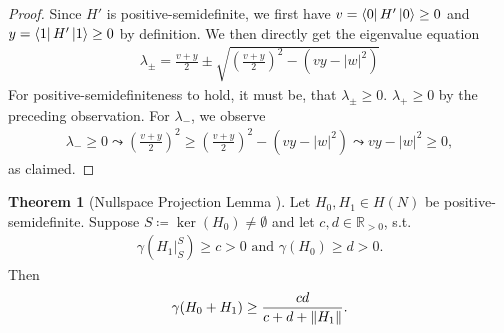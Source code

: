 \documentclass[10pt]{amsart}
\theoremstyle{definition}
\newtheorem{theorem}{Theorem}
\theoremstyle{remark}
\begin{document}
    \begin{proof}
        Since \(H'\) is positive-semidefinite, we first have \(v = \bra{0}H'\ket{0} \geq 0\) and \(y = \bra{1}H'\ket{1} \geq 0\) by definition. We then directly get the eigenvalue equation
        \begin{align}
            \lambda_\pm = \frac{v+y}{2} \pm \sqrt{\left(\frac{v+y}{2}\right)^2-(vy-|w|^2)}
        \end{align}
        For positive-semidefiniteness to hold, it must be, that \(\lambda_\pm \geq 0\). \(\lambda_+ \geq 0\) by the preceding observation. For \(\lambda_-\), we observe
        \begin{align}
            \lambda_- \geq 0 \leadsto \left(\frac{v+y}{2}\right)^2 \geq \left(\frac{v+y}{2}\right)^2-(vy-|w|^2) \leadsto vy-|w|^2 \geq 0,
        \end{align}
        as claimed.
    \end{proof}

    \begin{theorem}[{Nullspace Projection Lemma \cite[p. 73]{Childs_2014}}]
        Let \(H_0, H_1 \in H(N)\) be positive-semidefinite. Suppose \(S \coloneqq \ker(H_0) \neq \emptyset\) and let \(c, d \in \mathbb{R}_{> 0}\), s.t.
        \begin{align}
            \gamma(H_1|_S^S) \geq c > 0 \text{ and } \gamma(H_0) \geq d > 0.
        \end{align}
        Then
        \begin{align}
            \gamma(H_0+H_1) \geq \frac{cd}{c+d+\norm{H_1}}.
        \end{align}
    \end{theorem}
\end{document}
